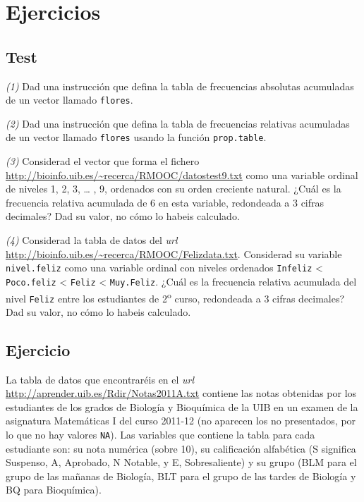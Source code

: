 \documentclass[]{book}
\theoremstyle{definition}
\theoremstyle{definition}
\theoremstyle{definition}
\theoremstyle{remark}
\begin{document}
\hypertarget{ejercicios-9}{%
\section{Ejercicios}\label{ejercicios-9}}

\hypertarget{test-8}{%
\subsection*{Test}\label{test-8}}

\emph{(1)} Dad una instrucción que defina la tabla de frecuencias absolutas acumuladas de un vector llamado \texttt{flores}.

\emph{(2)} Dad una instrucción que defina la tabla de frecuencias relativas acumuladas de un vector llamado \texttt{flores} usando la función \texttt{prop.table}.

\emph{(3)} Considerad el vector que forma el fichero \url{http://bioinfo.uib.es/~recerca/RMOOC/datostest9.txt} como una variable ordinal de niveles 1, 2, 3, \ldots{} , 9, ordenados con su orden creciente natural. ¿Cuál es la frecuencia relativa acumulada de 6 en esta variable, redondeada a 3 cifras decimales? Dad su valor, no cómo lo habeis calculado.

\emph{(4)} Considerad la tabla de datos del \emph{url} \url{http://bioinfo.uib.es/~recerca/RMOOC/Felizdata.txt}. Considerad su variable \texttt{nivel.feliz} como una variable ordinal con niveles ordenados \texttt{Infeliz} \textless{} \texttt{Poco.feliz} \textless{} \texttt{Feliz} \textless{} \texttt{Muy.Feliz}. ¿Cuál es la frecuencia relativa acumulada del nivel \texttt{Feliz} entre los estudiantes de 2\textsuperscript{o} curso, redondeada a 3 cifras decimales? Dad su valor, no cómo lo habeis calculado.

\hypertarget{ejercicio-8}{%
\subsection*{Ejercicio}\label{ejercicio-8}}

La tabla de datos que encontraréis en el \emph{url} \url{http://aprender.uib.es/Rdir/Notas2011A.txt} contiene las notas obtenidas por los estudiantes de los grados de Biología y Bioquímica de la UIB en un examen de la asignatura Matemáticas I del curso 2011-12 (no aparecen los no presentados, por lo que no hay valores \texttt{NA}). Las variables que contiene la tabla para cada estudiante son: su nota numérica (sobre 10), su calificación alfabética (S significa Suspenso, A, Aprobado, N Notable, y E, Sobresaliente) y su grupo (BLM para el grupo de las mañanas de Biología, BLT para el grupo de las tardes de Biología y BQ para Bioquímica).
\end{document}
